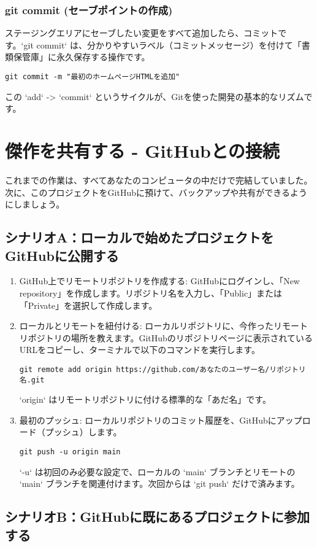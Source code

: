 \documentclass{ltjsarticle}
\begin{document}
\subsubsection{git commit (セーブポイントの作成)}
ステージングエリアにセーブしたい変更をすべて追加したら、コミットです。`git commit` は、分かりやすいラベル（コミットメッセージ）を付けて「書類保管庫」に永久保存する操作です。
\begin{verbatim}
git commit -m "最初のホームページHTMLを追加"
\end{verbatim}
この `add` -> `commit` というサイクルが、Gitを使った開発の基本的なリズムです。

\section{傑作を共有する - GitHubとの接続}
これまでの作業は、すべてあなたのコンピュータの中だけで完結していました。次に、このプロジェクトをGitHubに預けて、バックアップや共有ができるようにしましょう。

\subsection{シナリオA：ローカルで始めたプロジェクトをGitHubに公開する}
\begin{enumerate}
    \item GitHub上でリモートリポジトリを作成する: GitHubにログインし、「New repository」を作成します。リポジトリ名を入力し、「Public」または「Private」を選択して作成します。
    \item ローカルとリモートを紐付ける: ローカルリポジトリに、今作ったリモートリポジトリの場所を教えます。GitHubのリポジトリページに表示されているURLをコピーし、ターミナルで以下のコマンドを実行します。
    \begin{verbatim}
git remote add origin https://github.com/あなたのユーザー名/リポジトリ名.git
\end{verbatim}
    `origin` はリモートリポジトリに付ける標準的な「あだ名」です。
    \item 最初のプッシュ: ローカルリポジトリのコミット履歴を、GitHubにアップロード（プッシュ）します。
    \begin{verbatim}
git push -u origin main
\end{verbatim}
    `-u` は初回のみ必要な設定で、ローカルの `main` ブランチとリモートの `main` ブランチを関連付けます。次回からは `git push` だけで済みます。
\end{enumerate}

\subsection{シナリオB：GitHubに既にあるプロジェクトに参加する}
\end{document}
